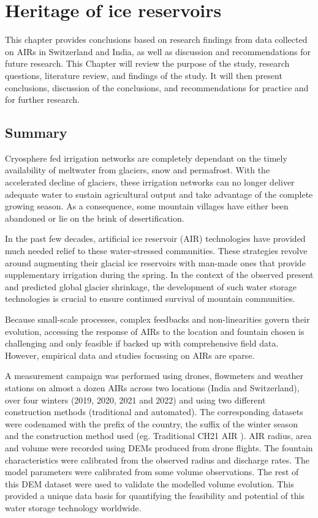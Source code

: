 \chapter{Heritage of ice reservoirs}

This chapter provides conclusions based on research findings from data collected on AIRs in Switzerland and India,
as well as discussion and recommendations for future research. This Chapter will review the purpose of the
study, research questions, literature review, and findings of the study. It will then present conclusions,
discussion of the conclusions, and recommendations for practice and for further research.

\section{Summary}

Cryosphere fed irrigation networks are completely dependant on the timely availability of meltwater from
glaciers, snow and permafrost. With the accelerated decline of glaciers, these irrigation networks can no longer
deliver adequate water to sustain agricultural output and take advantage of the complete growing season. As a
consequence, some mountain villages have either been abandoned or lie on the brink of desertification.

In the past few decades, artificial ice reservoir (AIR) technologies have provided much needed relief to these
water-stressed communities. These strategies revolve around augmenting their glacial ice reservoirs with
man-made ones that provide supplementary irrigation during the spring. In the context of the observed present
and predicted global glacier shrinkage, the development of such water storage technologies is crucial to ensure
continued survival of mountain communities.

Because small-scale processes, complex feedbacks and non-linearities govern their evolution, accessing the
response of AIRs to the location and fountain chosen is challenging and only feasible if backed up with
comprehensive field data. However, empirical data and studies focussing on AIRs are sparse.

A measurement campaign was performed using drones, flowmeters and weather stations on almost a dozen AIRs across
two locations (India and Switzerland), over four winters (2019, 2020, 2021 and 2022) and using two different
construction methods (traditional and automated). The corresponding datasets were codenamed with the prefix of
the country, the suffix of the winter season and the construction  method used (eg. Traditional CH21 AIR ). AIR
radius, area and volume were recorded using DEMs produced from drone flights. The fountain characteristics were
calibrated from the observed radius and discharge rates. The model parameters were calibrated from some volume
observations. The rest of this DEM dataset were used to validate the modelled volume evolution. This provided a
unique data basis for quantifying the feasibility and potential of this water storage technology worldwide.


